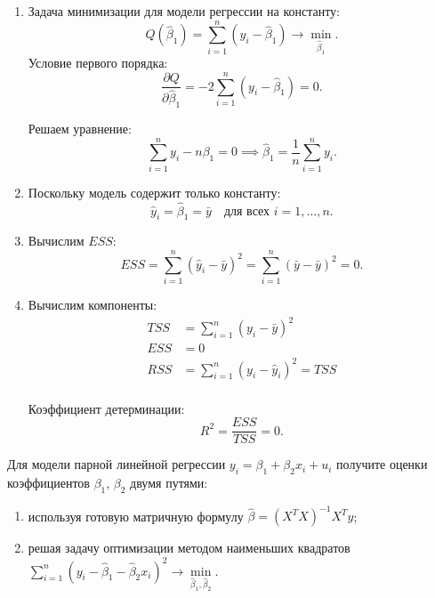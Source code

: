 \documentclass[12pt]{article}
\newcommand{\hb}{\hat{\beta}}
\newcommand{\ESS}{ESS}
\begin{document}
\begin{sol}
    
\begin{enumerate}
    \item Задача минимизации для модели регрессии на константу:
    \[
    Q(\hb_1) = \sum_{i=1}^n (y_i - \hb_1) \to \underset{\hb_1}{\min}.
    \]
Условие первого порядка:
\[
\frac{\partial Q}{\partial \hb_1} = -2\sum_{i=1}^n (y_i - \hb_1) = 0.
\]

Решаем уравнение:
\[
\sum_{i=1}^n y_i - n\beta_1 = 0 \implies \hb_1 = \frac{1}{n}\sum_{i=1}^n y_i.
\]


\item Поскольку модель содержит только константу:
\[
\hat{y}_i = \hat{\beta}_1 = \bar{y} \quad \text{для всех } i=1,\dots,n.
\]

\item Вычислим $\ESS$:
\[
\ESS = \sum_{i=1}^n (\hat{y}_i - \bar{y})^2 = \sum_{i=1}^n (\bar{y} - \bar{y})^2 = 0.
\]

\item Вычислим компоненты:
\begin{align*}
TSS &= \sum_{i=1}^n (y_i - \bar{y})^2 \\
ESS &= 0 \\
RSS &= \sum_{i=1}^n (y_i - \hat{y}_i)^2 = TSS \\
\end{align*}

Коэффициент детерминации:
\[
R^2 = \frac{ESS}{TSS} = 0.
\]
\end{enumerate}
\end{sol}

\begin{problem}
Для модели парной линейной регрессии $y_i = \beta_1 + \beta_2 x_i + u_i$ получите оценки коэффициентов $\beta_1$, $\beta_2$ двумя путями:

\begin{enumerate}
    \item используя готовую матричную формулу $\hb = (X^TX)^{-1}X^Ty$;
    \item решая задачу оптимизации методом наименьших квадратов $\sum^n_{i=1} (y_i - \hb_1 - \hb_2 x_i)^2 \to \underset{\hb_1, \hb_2}{\min}.$
\end{enumerate}   
\end{problem}
\end{document}
